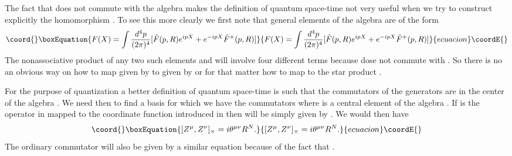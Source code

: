 \documentclass[a4paper,12pt]{article}
\begin{document}
The fact that \coordHE{} does not commute with the algebra \coordHE{} makes the
definition \coordHE{} of quantum space-time not very useful when we
try to construct explicitly the homomorphism \coordHE{} . To see
this more clearly we first note that general elements \coordHE{} of
the algebra \coordHE{} are of the form
\begin{equation}\coord{}\boxEquation{
F(X)=\int \frac{d^4p}{(2{\pi})^4}[\tilde{F}(p,R) e^{ipX} +
e^{-ipX}\tilde{F}^{+}(p,R)]
}{
F(X)=\int \frac{d^4p}{(2{\pi})^4}[\tilde{F}(p,R) e^{ipX} +
e^{-ipX}\tilde{F}^{+}(p,R)]
}{ecuacion}\coordE{}\end{equation}
The nonassociative product of any two such elements \coordHE{} and
\coordHE{} will involve four different terms because \coordHE{} dose not
commute with \coordHE{} .
 So there is no an obvious way on how to map \coordHE{} given by \coordHE{} to \coordHE{} given by
  \coordHE{} or for that matter how to map \coordHE{} to the star product \coordHE{} .

For the purpose of quantization a better definition of quantum
space-time \coordHE{} is such that the commutators of the generators
are in the center of the algebra . We need then to find a basis
\coordHE{} for which we have the commutators
\coordHE{} where
\coordHE{} is a central element of the algebra \coordHE{} . If \coordHE{}
is the operator in \coordHE{} mapped to the coordinate function \coordHE{}
introduced in \coordHE{} then \coordHE{} will be simply given by
\coordHE{} . We would then have
\begin{equation}\coord{}\boxEquation{
[Z^{\mu},Z^{\nu}]_{\times}=i{\theta}^{{\mu}{\nu}}R^N.
}{
[Z^{\mu},Z^{\nu}]_{\times}=i{\theta}^{{\mu}{\nu}}R^N.
}{ecuacion}\coordE{}\end{equation}
The ordinary commutator will also be given by a similar equation
\coordHE{} because of the
fact that
\coordHE{} .
\end{document}
